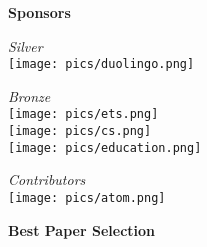 \documentclass[letterpaper,11pt,oneside]{book} %
\begin{document}
\clearpage


{} 



\begin{center}
  {\Large \bf Sponsors}
\end{center}

\vspace*{.5cm}

\begin{center}
  {\Large \it Silver}\\
  \vspace*{0.7cm} %
  \texttt{[image: pics/duolingo.png]}
\end{center}

\vspace*{.5cm}

\begin{center}
  {\Large \it Bronze}\\
  \vspace*{0.5cm}%
  \texttt{[image: pics/ets.png]} \\
  \texttt{[image: pics/cs.png]} \\
  \texttt{[image: pics/education.png]} 
\end{center}

\begin{center}
  {\Large \it Contributors}\\
  \vspace*{0.3cm}%
  \texttt{[image: pics/atom.png]} 
\end{center}


\clearpage


{} 

\begin{center}
  {\Large \bf Best Paper Selection}
\end{center}
\end{document}
